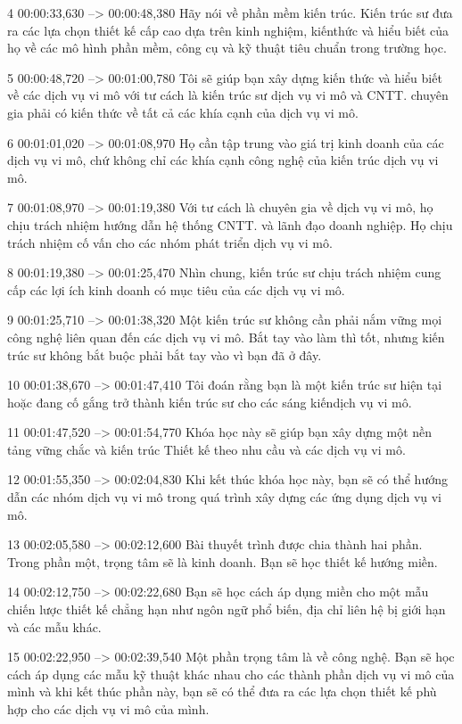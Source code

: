 4
00:00:33,630 --> 00:00:48,380
Hãy nói về phần mềm kiến ​​trúc.  Kiến trúc sư đưa ra các lựa chọn thiết kế cấp cao dựa trên kinh nghiệm, kiến ​​thức và hiểu biết của họ về các mô hình phần mềm, công cụ và kỹ thuật tiêu chuẩn trong trường học.

5
00:00:48,720 --> 00:01:00,780
Tôi sẽ giúp bạn xây dựng kiến ​​thức và hiểu biết về các dịch vụ vi mô với tư cách là kiến ​​trúc sư dịch vụ vi mô và CNTT.  chuyên gia phải có kiến ​​thức về tất cả các khía cạnh của dịch vụ vi mô.

6
00:01:01,020 --> 00:01:08,970
Họ cần tập trung vào giá trị kinh doanh của các dịch vụ vi mô, chứ không chỉ các khía cạnh công nghệ của kiến ​​trúc dịch vụ vi mô.

7
00:01:08,970 --> 00:01:19,380
Với tư cách là chuyên gia về dịch vụ vi mô, họ chịu trách nhiệm hướng dẫn hệ thống CNTT.  và lãnh đạo doanh nghiệp.  Họ chịu trách nhiệm cố vấn cho các nhóm phát triển dịch vụ vi mô.

8
00:01:19,380 --> 00:01:25,470
Nhìn chung, kiến ​​trúc sư chịu trách nhiệm cung cấp các lợi ích kinh doanh có mục tiêu của các dịch vụ vi mô.

9
00:01:25,710 --> 00:01:38,320
Một kiến ​​trúc sư không cần phải nắm vững mọi công nghệ liên quan đến các dịch vụ vi mô.  Bắt tay vào làm thì tốt, nhưng kiến ​​trúc sư không bắt buộc phải bắt tay vào vì bạn đã ở đây.

10
00:01:38,670 --> 00:01:47,410
Tôi đoán rằng bạn là một kiến ​​trúc sư hiện tại hoặc đang cố gắng trở thành kiến ​​trúc sư cho các sáng kiến ​​​​dịch vụ vi mô.

11
00:01:47,520 --> 00:01:54,770
Khóa học này sẽ giúp bạn xây dựng một nền tảng vững chắc và kiến ​​trúc Thiết kế theo nhu cầu và các dịch vụ vi mô.

12
00:01:55,350 --> 00:02:04,830
Khi kết thúc khóa học này, bạn sẽ có thể hướng dẫn các nhóm dịch vụ vi mô trong quá trình xây dựng các ứng dụng dịch vụ vi mô.

13
00:02:05,580 --> 00:02:12,600
Bài thuyết trình được chia thành hai phần.  Trong phần một, trọng tâm sẽ là kinh doanh.  Bạn sẽ học thiết kế hướng miền.

14
00:02:12,750 --> 00:02:22,680
Bạn sẽ học cách áp dụng miền cho một mẫu chiến lược thiết kế chẳng hạn như ngôn ngữ phổ biến, địa chỉ liên hệ bị giới hạn và các mẫu khác.

15
00:02:22,950 --> 00:02:39,540
Một phần trọng tâm là về công nghệ.  Bạn sẽ học cách áp dụng các mẫu kỹ thuật khác nhau cho các thành phần dịch vụ vi mô của mình và khi kết thúc phần này, bạn sẽ có thể đưa ra các lựa chọn thiết kế phù hợp cho các dịch vụ vi mô của mình.

